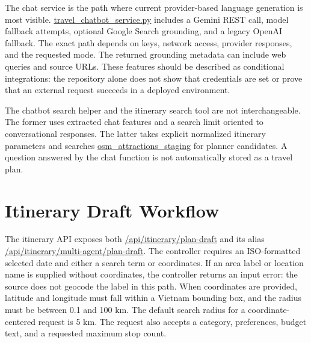 The chat service is the path where current provider-based language generation is most visible. \url{travel_chatbot_service.py} includes a Gemini REST call, model fallback attempts, optional Google Search grounding, and a legacy OpenAI fallback. The exact path depends on keys, network access, provider responses, and the requested mode. The returned grounding metadata can include web queries and source URLs. These features should be described as conditional integrations: the repository alone does not show that credentials are set or prove that an external request succeeds in a deployed environment.

The chatbot search helper and the itinerary search tool are not interchangeable. The former uses extracted chat features and a search limit oriented to conversational responses. The latter takes explicit normalized itinerary parameters and searches \url{osm_attractions_staging} for planner candidates. A question answered by the chat function is not automatically stored as a travel plan.

\section{Itinerary Draft Workflow}

The itinerary API exposes both \url{/api/itinerary/plan-draft} and its alias \url{/api/itinerary/multi-agent/plan-draft}. The controller requires an ISO-formatted selected date and either a search term or coordinates. If an area label or location name is supplied without coordinates, the controller returns an input error: the source does not geocode the label in this path. When coordinates are provided, latitude and longitude must fall within a Vietnam bounding box, and the radius must be between 0.1 and 100 km. The default search radius for a coordinate-centered request is 5 km. The request also accepts a category, preferences, budget text, and a requested maximum stop count.

